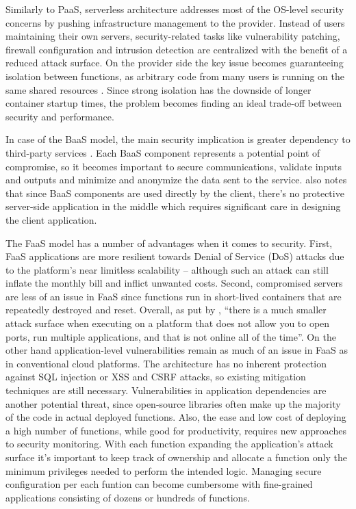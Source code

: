 Similarly to PaaS, serverless architecture addresses most of the OS-level security concerns by pushing infrastructure management to the provider. Instead of users maintaining their own servers, security-related tasks like vulnerability patching, firewall configuration and intrusion detection are centralized with the benefit of a reduced attack surface. On the provider side the key issue becomes guaranteeing isolation between functions, as arbitrary code from many users is running on the same shared resources \parencite{mcgrath17implement}. Since strong isolation has the downside of longer container startup times, the problem becomes finding an ideal trade-off between security and performance. \parencite{van2017spec}

In case of the BaaS model, the main security implication is greater dependency to third-party services \parencite{segal18risks}. Each BaaS component represents a potential point of compromise, so it becomes important to secure communications, validate inputs and outputs and minimize and anonymize the data sent to the service. \textcite{robert2016serverlessarchitectures} also notes that since BaaS components are used directly by the client, there's no protective server-side application in the middle which requires significant care in designing the client application.

The FaaS model has a number of advantages when it comes to security. First, FaaS applications are more resilient towards Denial of Service (DoS) attacks due to the platform's near limitless scalability -- although such an attack can still inflate the monthly bill and inflict unwanted costs. Second, compromised servers are less of an issue in FaaS since functions run in short-lived containers that are repeatedly destroyed and reset. Overall, as put by \textcite{wagner16resilient}, ``there is a much smaller attack surface when executing on a platform that does not allow you to open ports, run multiple applications, and that is not online all of the time''. On the other hand application-level vulnerabilities remain as much of an issue in FaaS as in conventional cloud platforms. The architecture has no inherent protection against SQL injection or XSS and CSRF attacks, so existing mitigation techniques are still necessary. Vulnerabilities in application dependencies are another potential threat, since open-source libraries often make up the majority of the code in actual deployed functions. Also, the ease and low cost of deploying a high number of functions, while good for productivity, requires new approaches to security monitoring. With each function expanding the application's attack surface it's important to keep track of ownership and allocate a function only the minimum privileges needed to perform the intended logic. Managing secure configuration per each funtion can become cumbersome with fine-grained applications consisting of dozens or hundreds of functions. \parencite{podjarny17security}

